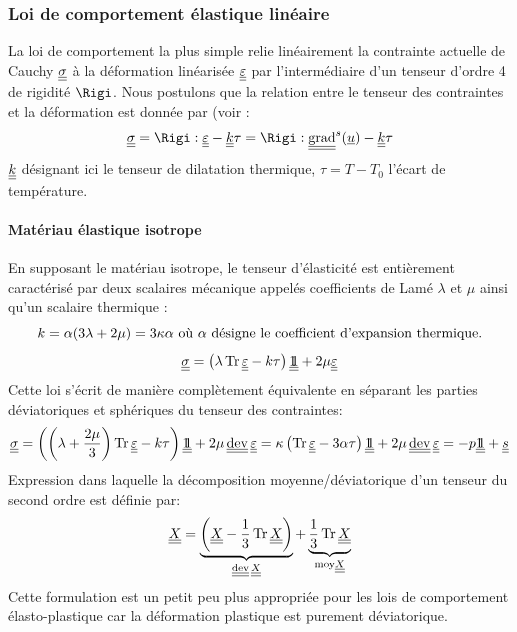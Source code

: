 \documentclass[10pt]{book}
\begin{document}
\begin{appendices}
\subsubsection{Loi de comportement élastique linéaire}
La loi de comportement la plus simple relie linéairement la contrainte actuelle de Cauchy $\underline{\underline{\sigma}}$ à la déformation linéarisée $\underline{\underline{\varepsilon}}$ par l'intermédiaire d'un tenseur d'ordre 4 de \og rigidité \fg{} $\Rigi$. Nous postulons que la relation entre le tenseur des contraintes et la déformation est donnée par (voir \cite{salenccon2005mecanique, forest2015mecanique}:
\begin{equation}
\SC = \Rigi:\DefoHPP-\ten{k} \tau=\Rigi:\GradSym(\Dep)-\ten{k} \tau
\label{eq:elasticité_lineaire_thermo}
\end{equation}
$\underline{\underline{k}}$ désignant ici le tenseur de dilatation thermique, $\tau=T-T_{0}$ l'écart de température.
\paragraph{Matériau élastique isotrope} En supposant le matériau isotrope, le tenseur d'élasticité est entièrement caractérisé par deux scalaires \og mécanique \fg{} appelés \og coefficients de Lamé \fg{} $\lambda$ et $\mu$ ainsi qu'un scalaire \og thermique \fg{}:
\begin{equation}
k=\alpha(3\lambda+2\mu)=3\kappa\alpha \text{ où }\alpha\text{ désigne le coefficient d’expansion thermique.}
\label{eq:defi_coeff_expansion_thermique}
\end{equation}
\begin{equation}
\SC = \left(\lambda\tr\DefoHPP-k\tau\right)\TU +2\mu\DefoHPP
\label{eq:elasticité_lineaire_thermo_iso}
\end{equation}
Cette loi s'écrit de manière complètement équivalente en séparant les parties déviatoriques et sphériques du tenseur des contraintes:
\begin{equation}
\SC = \left(\left(\lambda+\dfrac{2\mu}{3}\right)\tr\DefoHPP-k\tau\right)\TU +2\mu\dev\DefoHPP= \BulkModulus\left(\tr\DefoHPP-3\alpha\tau\right)\TU +2\mu\dev\DefoHPP=-p\TU+\devia
\label{eq:scission_lin_dev_sph_iso}
\end{equation}
Expression dans laquelle la décomposition moyenne/déviatorique d'un tenseur du second ordre est définie par:
$$\ten{X}=\underbrace{\left(\ten{X}-\dfrac{1}{3}\tr\ten{X}\right)}_{\dev\ten{X}}+\underbrace{\dfrac{1}{3}\tr\ten{X}}_{\mathrm{moy}\ten{X}}$$
Cette formulation est un petit peu plus appropriée pour les lois de comportement élasto-plastique car  la déformation plastique est purement déviatorique.\\


\end{appendices}
\end{document}
